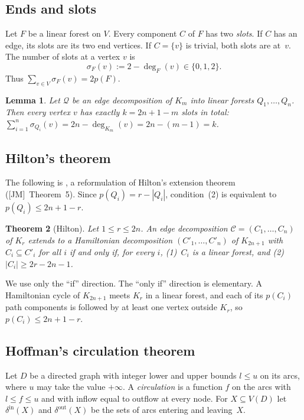 \documentclass[11pt]{amsart}
\newtheorem{theorem}{Theorem}[section]
\newtheorem{lemma}[theorem]{Lemma}
\theoremstyle{definition}
\theoremstyle{remark}
\newcommand{\Q}{\mathcal{Q}}
\newcommand{\cC}{\mathcal{C}}
\newcommand{\JM}{\textup{[JM]}}
\begin{document}
\subsection{Ends and slots}
Let $F$ be a linear forest on $V$. Every component $C$ of $F$ has two \emph{slots}. If $C$ has
an edge, its slots are its two end vertices. If $C=\{v\}$ is trivial, both slots are at~$v$.
The number of slots at a vertex $v$ is
\[
\sigma_F(v):=2-\deg_F(v)\in\{0,1,2\}.
\]
Thus $\sum_{v\in V}\sigma_F(v)=2p(F)$.

\begin{lemma}\label{lem:slots}
Let $\Q$ be an edge decomposition of $K_m$ into linear forests $Q_1,\dots,Q_n$. Then every
vertex $v$ has exactly $k=2n+1-m$ slots in total:
$\sum_{i=1}^n\sigma_{Q_i}(v)=2n-\deg_{K_m}(v)=2n-(m-1)=k$.
\end{lemma}

\subsection{Hilton's theorem}
The following is \cite[Corollary~6]{JM}, a reformulation of Hilton's extension theorem
\cite{Hilton} (\JM\ Theorem~5). Since $p(Q_i)=r-|Q_i|$, condition~(2) is equivalent to
$p(Q_i)\le 2n+1-r$.

\begin{theorem}[Hilton]\label{thm:hilton}
Let $1\le r\le 2n$. An edge decomposition $\cC=(C_1,\dots,C_n)$ of $K_r$ extends to a
Hamiltonian decomposition $(C'_1,\dots,C'_n)$ of $K_{2n+1}$ with $C_i\subseteq C'_i$ for all
$i$ if and only if, for every $i$, \textup{(1)}~$C_i$ is a linear forest, and
\textup{(2)}~$|C_i|\ge 2r-2n-1$.
\end{theorem}

We use only the ``if'' direction. The ``only if'' direction is elementary. A Hamiltonian cycle
of $K_{2n+1}$ meets $K_r$ in a linear forest, and each of its $p(C_i)$ path components is
followed by at least one vertex outside $K_r$, so $p(C_i)\le 2n+1-r$.

\subsection{Hoffman's circulation theorem}
Let $D$ be a directed graph with integer lower and upper bounds $l\le u$ on its arcs, where
$u$ may take the value $+\infty$. A \emph{circulation} is a function $f$ on the arcs with
$l\le f\le u$ and with inflow equal to outflow at every node. For $X\subseteq V(D)$ let
$\delta^{\mathrm{in}}(X)$ and $\delta^{\mathrm{out}}(X)$ be the sets of arcs entering and
leaving~$X$.
\end{document}
